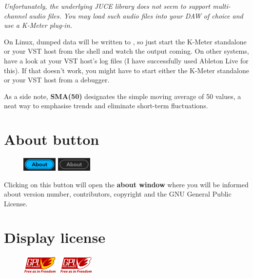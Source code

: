 \emph{Unfortunately, the underlying JUCE library does not seem to
  support multi-channel audio files.  You may load such audio files
  into your DAW of choice and use a K-Meter plug-in.}

On Linux, dumped data will be written to , so just start
the K-Meter standalone or your VST host from the shell and watch the
output coming.  On other systems, have a look at your VST host's log
files (I have successfully used Ableton Live for this).  If that
doesn't work, you might have to start either the K-Meter standalone or
your VST host from a debugger.

As a side note, \textbf{SMA(50)} designates the simple moving average
of 50 values, a neat way to emphasise trends and eliminate short-term
fluctuations.

\section{About button}

\begin{figure}
\includegraphics[scale=\screenshotscale,clip]{include/images/button_about_on.png}
\newline \vspace{-0.9\baselineskip}
\includegraphics[scale=\screenshotscale,clip]{include/images/button_about_off.png}
\end{figure}

Clicking on this button will open the \textbf{about window} where you
will be informed about version number, contributors, copyright and the
GNU General Public License.

\section{Display license}

\begin{figure}
\includegraphics[scale=\screenshotscale,clip]{include/images/button_gpl_on.png}
\newline \vspace{-0.9\baselineskip}
\includegraphics[scale=\screenshotscale,clip]{include/images/button_gpl_off.png}
\end{figure}

